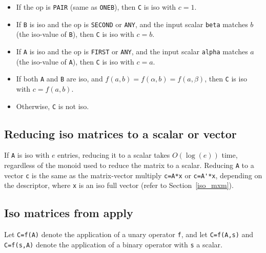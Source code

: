 \documentclass[12pt]{article}
\begin{document}
{\begin{itemize}
    \item If the op is \verb'PAIR' (same as \verb'ONEB'),
        then \verb'C' is iso with $c=1$.

    \item If \verb'B' is iso and the op is \verb'SECOND' or \verb'ANY',
        and the input scalar \verb'beta' matches $b$
        (the iso-value of \verb'B'),
        then \verb'C' is iso with $c=b$.

    \item If \verb'A' is iso and the op is \verb'FIRST' or \verb'ANY',
        and the input scalar \verb'alpha' matches $a$
        (the iso-value of \verb'A'),
        then \verb'C' is iso with $c=a$.

    \item If both \verb'A' and \verb'B' are iso,
        and $f(a,b) = f(\alpha,b) = f(a,\beta)$,
        then \verb'C' is iso with $c=f(a,b)$.

    \item Otherwise, \verb'C' is not iso.
    \end{itemize}

\subsection{Reducing iso matrices to a scalar or vector}
\label{iso_reduce}

If \verb'A' is iso with $e$ entries, reducing it to a scalar takes $O(\log(e))$
time, regardless of the monoid used to reduce the matrix to a scalar.  Reducing
\verb'A' to a vector \verb'c' is the same as the matrix-vector multiply
\verb"c=A*x" or \verb"c=A'*x", depending on the descriptor, where \verb'x'
is an iso full vector (refer to Section~\ref{iso_mxm}).

\subsection{Iso matrices from apply}
\label{iso_apply}

Let \verb'C=f(A)' denote the application of a unary operator \verb'f',
and let \verb'C=f(A,s)' and \verb'C=f(s,A)' denote the application of a binary
operator with \verb's' a scalar.

}
\end{document}
